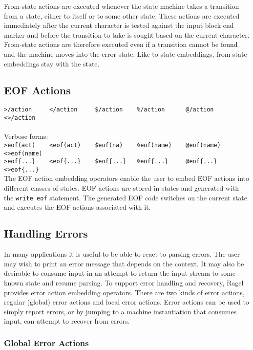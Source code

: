 \documentclass[letterpaper,11pt,oneside]{book}
\begin{document}
From-state actions are executed whenever the state machine takes a transition from a
state, either to itself or to some other state. These actions are executed
immediately after the current character is tested against the input block end
marker and before the transition to take is sought based on the current
character. From-state actions are therefore executed even if a transition
cannot be found and the machine moves into the error state.  Like to-state
embeddings, from-state embeddings stay with the state.

\subsection{EOF Actions}

\noindent\verb|>/action     </action     $/action    %/action      @/action      <>/action|\\
\\
\noindent Verbose forms:\\
\noindent\verb|>eof(act)    <eof(act)    $eof(na)    %eof(name)    @eof(name)    <>eof(name)|\\
\noindent\verb|>eof{...}    <eof{...}    $eof{...}   %eof{...}     @eof{...}     <>eof{...}|
\\


The EOF action embedding operators enable the user to embed EOF actions into
different classes of
states.  EOF actions are stored in states and generated with the \verb|write eof|
statement. The generated EOF code switches on the current state and executes the EOF
actions associated with it.

\subsection{Handling Errors}

In many applications it is useful to be able to react to parsing errors.  The
user may wish to print an error message that depends on the context.  It
may also be desirable to consume input in an attempt to return the input stream
to some known state and resume parsing. To support error handling and recovery,
Ragel provides error action embedding operators. There are two kinds of error
actions, regular (global) error actions and local error actions.
Error actions can be used to simply report errors, or by jumping to a machine
instantiation that consumes input, can attempt to recover from errors.  

\subsubsection{Global Error Actions}
\end{document}
